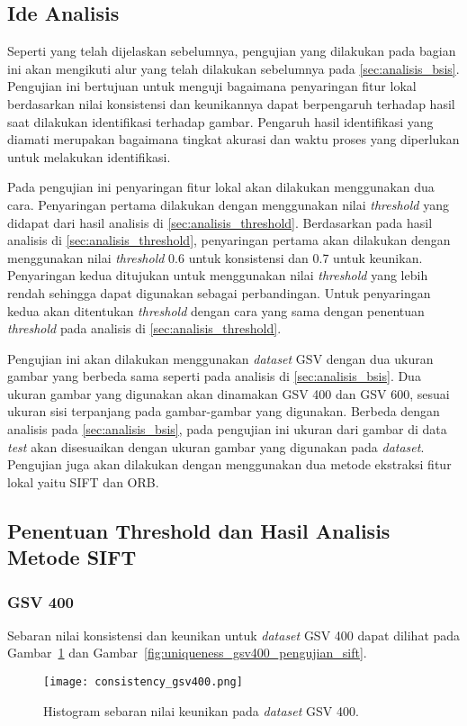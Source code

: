 \subsection{Ide Analisis}
Seperti yang telah dijelaskan sebelumnya, pengujian yang dilakukan pada bagian ini akan mengikuti alur yang telah dilakukan sebelumnya pada \ref{sec:analisis_bsis}. Pengujian ini bertujuan untuk menguji bagaimana penyaringan fitur lokal berdasarkan nilai konsistensi dan keunikannya dapat berpengaruh terhadap hasil saat dilakukan identifikasi terhadap gambar. Pengaruh hasil identifikasi yang diamati merupakan bagaimana tingkat akurasi dan waktu proses yang diperlukan untuk melakukan identifikasi.

Pada pengujian ini penyaringan fitur lokal akan dilakukan menggunakan dua cara. Penyaringan pertama dilakukan dengan menggunakan nilai \textit{threshold} yang didapat dari hasil analisis di \ref{sec:analisis_threshold}. Berdasarkan pada hasil analisis di \ref{sec:analisis_threshold}, penyaringan pertama akan dilakukan dengan menggunakan nilai \textit{threshold} 0.6 untuk konsistensi dan 0.7 untuk keunikan. Penyaringan kedua ditujukan untuk menggunakan nilai \textit{threshold} yang lebih rendah sehingga dapat digunakan sebagai perbandingan. Untuk penyaringan kedua akan ditentukan \textit{threshold} dengan cara yang sama dengan penentuan \textit{threshold} pada analisis di \ref{sec:analisis_threshold}. 

Pengujian ini akan dilakukan menggunakan \textit{dataset} GSV dengan dua ukuran gambar yang berbeda sama seperti pada analisis di \ref{sec:analisis_bsis}. Dua ukuran gambar yang digunakan akan dinamakan GSV 400 dan GSV 600, sesuai ukuran sisi terpanjang pada gambar-gambar yang digunakan. Berbeda dengan analisis pada \ref{sec:analisis_bsis}, pada pengujian ini ukuran dari gambar di data \textit{test} akan disesuaikan dengan ukuran gambar yang digunakan pada \textit{dataset}. Pengujian juga akan dilakukan dengan menggunakan dua metode ekstraksi fitur lokal yaitu SIFT dan ORB.

\subsection{Penentuan Threshold dan Hasil Analisis Metode SIFT}
\subsubsection{GSV 400}
Sebaran nilai konsistensi dan keunikan untuk \textit{dataset} GSV 400 dapat dilihat pada Gambar~\ref{fig:consistency_gsv400_pengujian_sift} dan Gambar~\ref{fig:uniqueness_gsv400_pengujian_sift}.
\begin{figure}[H]
	\centering
	\texttt{[image: consistency\_gsv400.png]}
	\caption{Histogram sebaran nilai keunikan pada \textit{dataset} GSV 400.}
	\label{fig:consistency_gsv400_pengujian_sift}
\end{figure}

